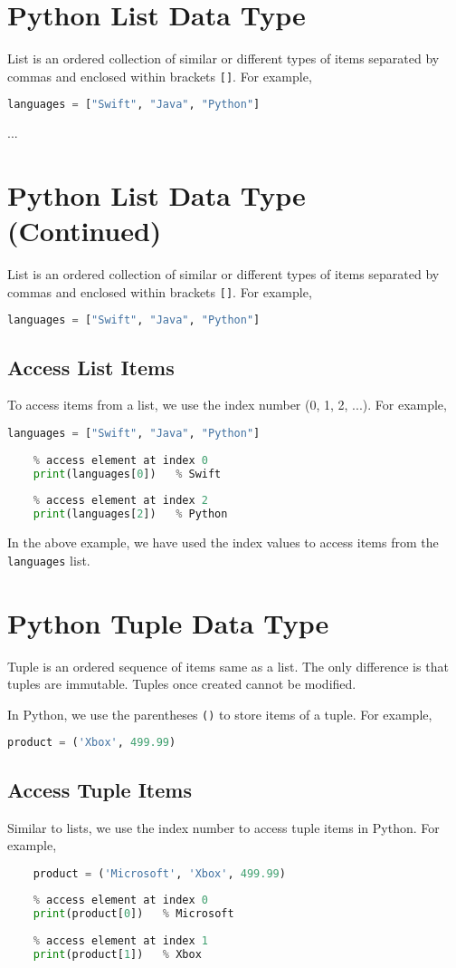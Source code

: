 \documentclass{article}
\begin{document}
	\section{Python List Data Type}
	List is an ordered collection of similar or different types of items separated by commas and enclosed within brackets \texttt{[]}. For example,
	\begin{lstlisting}[language=Python]
		languages = ["Swift", "Java", "Python"]
	\end{lstlisting}
	...

\section{Python List Data Type (Continued)}
List is an ordered collection of similar or different types of items separated by commas and enclosed within brackets \texttt{[]}. For example,
\begin{lstlisting}[language=Python]
	languages = ["Swift", "Java", "Python"]
\end{lstlisting}

\subsection{Access List Items}
To access items from a list, we use the index number (0, 1, 2, ...). For example,
\begin{lstlisting}[language=Python]
	languages = ["Swift", "Java", "Python"]
	
	% access element at index 0
	print(languages[0])   % Swift
	
	% access element at index 2
	print(languages[2])   % Python
\end{lstlisting}
In the above example, we have used the index values to access items from the \texttt{languages} list.

\section{Python Tuple Data Type}
Tuple is an ordered sequence of items same as a list. The only difference is that tuples are immutable. Tuples once created cannot be modified.

In Python, we use the parentheses \texttt{()} to store items of a tuple. For example,
\begin{lstlisting}[language=Python]
	product = ('Xbox', 499.99)
\end{lstlisting}

\subsection{Access Tuple Items}
Similar to lists, we use the index number to access tuple items in Python. For example,
\begin{lstlisting}[language=Python]
	% create a tuple 
	product = ('Microsoft', 'Xbox', 499.99)
	
	% access element at index 0
	print(product[0])   % Microsoft
	
	% access element at index 1
	print(product[1])   % Xbox
\end{lstlisting}
\end{document}
